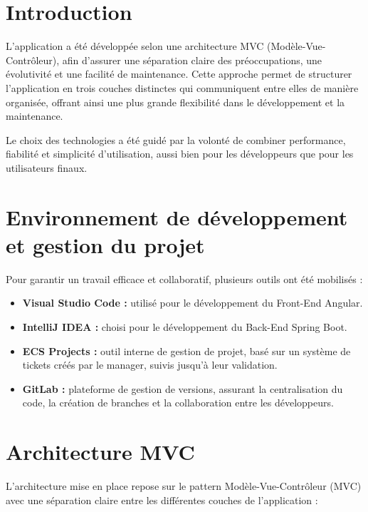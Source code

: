 
\section{Introduction}

L'application a été développée selon une architecture MVC (Modèle-Vue-Contrôleur), afin d'assurer une séparation claire des préoccupations, une évolutivité et une facilité de maintenance. Cette approche permet de structurer l'application en trois couches distinctes qui communiquent entre elles de manière organisée, offrant ainsi une plus grande flexibilité dans le développement et la maintenance.

Le choix des technologies a été guidé par la volonté de combiner performance, fiabilité et simplicité d’utilisation, aussi bien pour les développeurs que pour les utilisateurs finaux.

\section{Environnement de développement et gestion du projet}

Pour garantir un travail efficace et collaboratif, plusieurs outils ont été mobilisés :

\begin{itemize}
    \item \textbf{Visual Studio Code :} utilisé pour le développement du Front-End Angular.
    \item \textbf{IntelliJ IDEA :} choisi pour le développement du Back-End Spring Boot.
    \item \textbf{ECS Projects :} outil interne de gestion de projet, basé sur un système de tickets créés par le manager, suivis jusqu’à leur validation.
    \item \textbf{GitLab :} plateforme de gestion de versions, assurant la centralisation du code, la création de branches et la collaboration entre les développeurs.
\end{itemize}

\section{Architecture MVC}

L'architecture mise en place repose sur le pattern Modèle-Vue-Contrôleur (MVC) avec une séparation claire entre les différentes couches de l'application :

